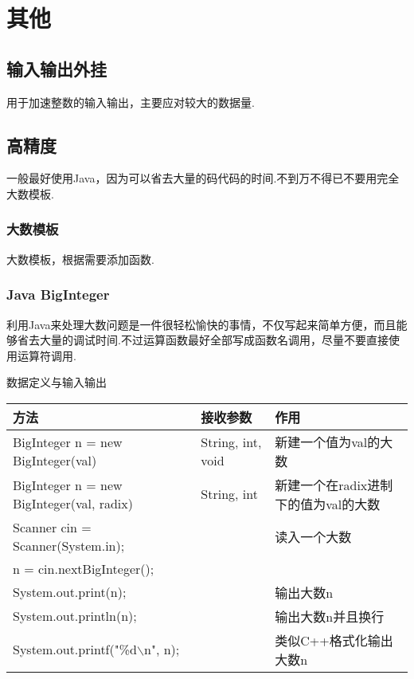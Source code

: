 \clearpage\chapter{其他}

\section{输入输出外挂}\small
用于加速整数的输入输出，主要应对较大的数据量.



\section{高精度}\small
一般最好使用Java，因为可以省去大量的码代码的时间.不到万不得已不要用完全
大数模板.


    \subsection{大数模板}\small
大数模板，根据需要添加函数.



    \subsection{Java BigInteger}\small
利用Java来处理大数问题是一件很轻松愉快的事情，不仅写起来简单方便，而且能
够省去大量的调试时间.不过运算函数最好全部写成函数名调用，尽量不要直接使
用运算符调用.

数据定义与输入输出
\begin{longtable}{|p{6.2cm}|p{2.7cm}|p{6.2cm}|}
\hline
方法 & 接收参数 & 作用 \\
\hline
 BigInteger n = new BigInteger(val) & String, int, void & 新建一个值为val的大数 \\
\hline
 BigInteger n = new BigInteger(val, radix) & String, int & 新建一个在radix进制下的值为val的大数 \\
\hline
 Scanner cin = Scanner(System.in); & & 读入一个大数 \\
 n = cin.nextBigInteger(); & & \\
\hline
 System.out.print(n); & & 输出大数n \\
\hline
 System.out.println(n); & & 输出大数n并且换行 \\
\hline
 System.out.printf("\%d$\backslash$n", n); & & 类似C++格式化输出大数n \\
\hline
\end{longtable}

